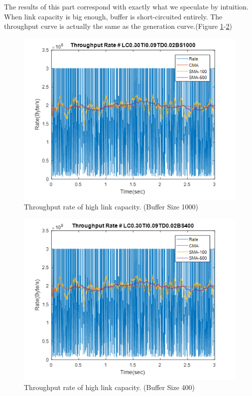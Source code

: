 \documentclass[a4paper]{article}
\begin{document}
The results of this part correspond with exactly what we speculate by intuition. When link capacity is big enough, buffer is short-circuited entirely. The throughput curve is actually the same as the generation curve.(Figure \ref{fig:LC30BS1000}-\ref{fig:LC30BS400})


\begin{figure}
\centering
\includegraphics[width=1\textwidth]{LC30BS1000.png}
\caption{\label{fig:LC30BS1000}Throughput rate of high link capacity. (Buffer Size 1000)}
\end{figure}

\begin{figure}
\centering
\includegraphics[width=1\textwidth]{LC30BS400.png}
\caption{\label{fig:LC30BS400}Throughput rate of high link capacity. (Buffer Size 400)}
\end{figure}
\end{document}

